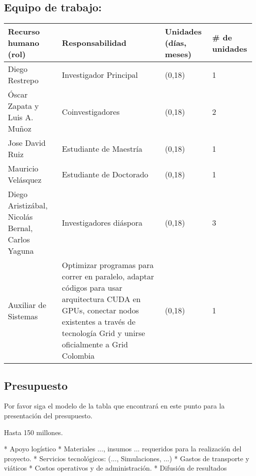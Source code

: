 \begin{bbrpvlhc}
\subsection{Equipo de trabajo:}
\begin{tabular}{|p{3.7cm}|p{5cm} |l|l|}\hline
Recurso humano (rol)& Responsabilidad& Unidades (días, meses)& \# de unidades\\\hline
Diego Restrepo&Investigador Principal&(0,18)&1\\\hline
Óscar Zapata y Luis A. Muñoz & Coinvestigadores &(0,18)&2\\\hline
Jose David Ruiz & Estudiante de Maestría &(0,18)&1 \\\hline
Mauricio Velásquez & Estudiante de Doctorado &(0,18)&1\\\hline
Diego Aristizábal,
Nicolás Bernal, 
Carlos Yaguna & Investigadores diáspora &(0,18)&3\\\hline
Auxiliar de Sistemas & Optimizar programas para correr en paralelo, 
                       adaptar códigos para usar arquitectura CUDA en GPUs, 
                       conectar nodos existentes a través de tecnología 
                       Grid y unirse oficialmente a Grid Colombia &(0,18)&1\\\hline
\end{tabular}

\subsection{Presupuesto}
\begin{instrucciones}
  Por favor siga el modelo de la tabla que encontrará en este punto
  para la presentación del presupuesto.

  Hasta 150 millones.
  
  * Apoyo logístico
  * Materiales ..., insumos ... requeridos para la realización del proyecto.
  * Servicios tecnológicos: (..., Simulaciones, ...)
  * Gastos de transporte y viáticos
  * Costos operativos y de administración.
  * Difusión de resultados


\end{instrucciones}
\end{bbrpvlhc}
